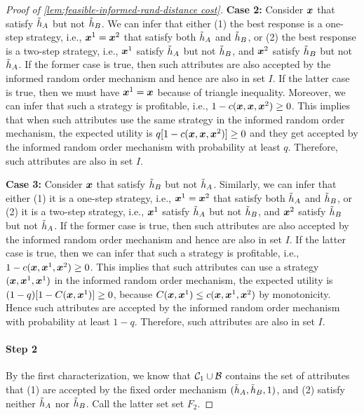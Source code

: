 \begin{proof}[Proof of \cref{lem:feasible-informed-rand-distance cost}]
\textbf{Case 2:} Consider $\boldsymbol{x}$ that satisfy $\tilde{h}_A$ but not $\tilde{h}_B$.
We can infer that either (1) the best response is a one-step strategy, i.e.,  $\boldsymbol{x}^1=\boldsymbol{x}^2$ that satisfy both $\tilde{h}_A$ and $\tilde{h}_B$, or (2) the best response  is a two-step strategy, i.e., $\boldsymbol{x}^1$  satisfy $\tilde{h}_A$ but not $\tilde{h}_B$, and $\boldsymbol{x}^2$ satisfy $\tilde{h}_B$ but not $\tilde{h}_A$.
If the former case is true, then such attributes are also accepted by the informed random order mechanism and hence are also in set $I$.
If the latter case is true, then we must have $\boldsymbol{x}^1=\boldsymbol{x}$ because of triangle inequality.
Moreover, we can infer that such a strategy is profitable, i.e., $1-c(\boldsymbol{x},\boldsymbol{x},\boldsymbol{x}^2)\geq 0$.
This implies that when such attributes use the same strategy in the informed random order mechanism, the expected utility is $q[1-c(\boldsymbol{x},\boldsymbol{x},\boldsymbol{x}^2)]\geq 0$ and they get accepted by the informed random order mechanism with probability at least $q$.
Therefore, such attributes are also in set  $I$.

\textbf{Case 3:} Consider $\boldsymbol{x}$ that satisfy $\tilde{h}_B$ but not $\tilde{h}_A$.
Similarly, we can infer that either (1) it is a one-step strategy, i.e.,  $\boldsymbol{x}^1=\boldsymbol{x}^2$ that satisfy both $\tilde{h}_A$ and $\tilde{h}_B$, or (2) it is a two-step strategy, i.e., $\boldsymbol{x}^1$  satisfy $\tilde{h}_A$ but not $\tilde{h}_B$, and $\boldsymbol{x}^2$ satisfy $\tilde{h}_B$ but not $\tilde{h}_A$.
If the former case is true, then such attributes are also accepted by the informed random order mechanism and hence are also in set  $I$.
If the latter case is true, then we can infer that such a strategy is profitable, i.e., $1-c(\boldsymbol{x},\boldsymbol{x}^1,\boldsymbol{x}^2)\geq 0$.
This implies that such attributes can use a strategy $(\boldsymbol{x},\boldsymbol{x}^1,\boldsymbol{x}^1)$ in the informed random order mechanism, the expected utility is $(1-q)[1-C(\boldsymbol{x},\boldsymbol{x}^1)]\geq 0$, because $C(\boldsymbol{x},\boldsymbol{x}^1)\leq c(\boldsymbol{x},\boldsymbol{x}^1,\boldsymbol{x}^2)$ by monotonicity.
Hence such attributes are  accepted by the informed random order mechanism with probability at least $1-q$.
Therefore, such attributes are also in set  $I$.



\paragraph{Step 2} By the first characterization, we know that $\mathcal{C}_1\cup \mathcal{B}$ contains the set of attributes that (1) are accepted by the fixed order mechanism  $(\tilde{h}_A,\tilde{h}_B,1)$, and (2) satisfy neither $\tilde{h}_A$ nor $\tilde{h}_B$.
Call the latter set set $F_2$.


\end{proof}
